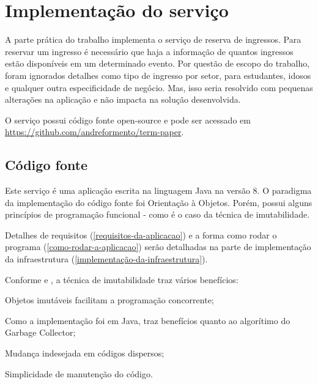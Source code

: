 \chapter{Implementação do serviço}\label{implementacao-do-servico}


A parte prática do trabalho implementa o serviço de reserva de ingressos.
Para reservar um ingresso é necessário que haja a informação de quantos ingressos
estão disponíveis em um determinado evento. Por questão de escopo do trabalho,
foram ignorados detalhes como
tipo de ingresso por setor, para estudantes, idosos e qualquer outra especificidade
de negócio. Mas, isso seria resolvido com pequenas alterações na aplicação
e não impacta na solução desenvolvida.

O serviço possui código fonte open-source e pode ser acessado em
\url{https://github.com/andreformento/term-paper}.

\section{Código fonte}

Este serviço é uma aplicação escrita na linguagem Java na versão 8. O paradigma
da implementação do código fonte foi Orientação à Objetos. Porém, possui alguns
princípios de programação funcional - como é o caso da técnica de imutabilidade.

Detalhes de requisitos (\autoref{requisitos-da-aplicacao}) e a
forma como rodar o programa (\autoref{como-rodar-a-aplicacao}) serão detalhadas
na parte de implementação da infraestrutura (\autoref{implementação-da-infraestrutura}).

Conforme
\cite{does-immutability-really-mean-thread-safety} e \cite{java-doc-immutable-objects},
a técnica de imutabilidade traz vários benefícios:

\begin{alineas}

  \item Objetos imutáveis facilitam a programação concorrente;

  \item Como a implementação foi em Java, traz benefícios quanto ao algorítimo do
        Garbage Collector;

  \item Mudança indesejada em códigos dispersos;

  \item Simplicidade de manutenção do código.

\end{alineas}

